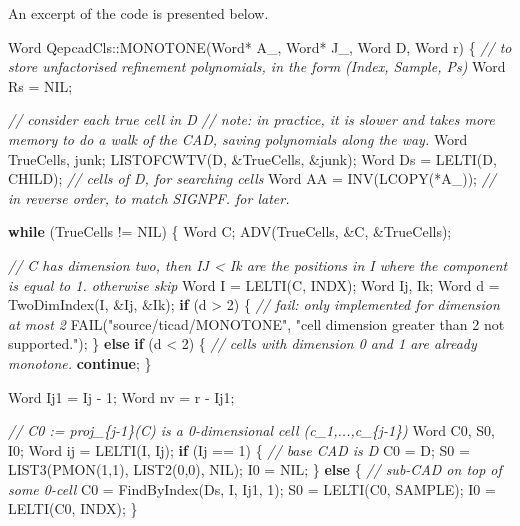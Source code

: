 \documentclass[
]{book}
\newenvironment{Shaded}{\begin{snugshade}}{\end{snugshade}}
\newcommand{\CommentTok}[1]{\textcolor[rgb]{0.56,0.35,0.01}{\textit{#1}}}
\newcommand{\ControlFlowTok}[1]{\textcolor[rgb]{0.13,0.29,0.53}{\textbf{#1}}}
\newcommand{\DecValTok}[1]{\textcolor[rgb]{0.00,0.00,0.81}{#1}}
\newcommand{\NormalTok}[1]{#1}
\newcommand{\StringTok}[1]{\textcolor[rgb]{0.31,0.60,0.02}{#1}}
\theoremstyle{definition}
\theoremstyle{definition}
\theoremstyle{definition}
\theoremstyle{definition}
\theoremstyle{remark}
\begin{document}
An excerpt of the code is presented below.

\begin{Shaded}
\begin{Highlighting}[numbers=left,,]
\NormalTok{Word QepcadCls::MONOTONE(Word* A\_, Word* J\_, Word D, Word r)}
\NormalTok{\{}
    \CommentTok{// to store unfactorised refinement polynomials, in the form (Index, Sample, Ps)}
\NormalTok{    Word Rs = NIL;}

    \CommentTok{// consider each true cell in D}
    \CommentTok{// note: in practice, it is slower and takes more memory to do a walk of the CAD, saving polynomials along the way.}
\NormalTok{    Word TrueCells, junk;}
\NormalTok{    LISTOFCWTV(D, \&TrueCells, \&junk);}
\NormalTok{    Word Ds = LELTI(D, CHILD); }\CommentTok{// cells of D, for searching cells}
\NormalTok{    Word AA = INV(LCOPY(*A\_)); }\CommentTok{// in reverse order, to match SIGNPF. for later.}

    \ControlFlowTok{while}\NormalTok{ (TrueCells != NIL) \{}
\NormalTok{        Word C;}
\NormalTok{        ADV(TrueCells, \&C, \&TrueCells);}

        \CommentTok{// C has dimension two, then IJ \textless{} Ik are the positions in I where the component is equal to 1. otherwise skip}
\NormalTok{        Word I = LELTI(C, INDX);}
\NormalTok{        Word Ij, Ik;}
\NormalTok{        Word d = TwoDimIndex(I, \&Ij, \&Ik);}
        \ControlFlowTok{if}\NormalTok{ (d \textgreater{} }\DecValTok{2}\NormalTok{) \{}
            \CommentTok{// fail: only implemented for dimension at most 2}
\NormalTok{            FAIL(}\StringTok{"source/ticad/MONOTONE"}\NormalTok{, }\StringTok{"cell dimension greater than 2 not supported."}\NormalTok{);}
\NormalTok{        \} }\ControlFlowTok{else} \ControlFlowTok{if}\NormalTok{ (d \textless{} }\DecValTok{2}\NormalTok{) \{}
            \CommentTok{// cells with dimension 0 and 1 are already monotone.}
            \ControlFlowTok{continue}\NormalTok{;}
\NormalTok{        \}}

\NormalTok{        Word Ij1 = Ij {-} }\DecValTok{1}\NormalTok{;}
\NormalTok{        Word nv = r {-} Ij1;}

        \CommentTok{// C0 := proj\_\{j{-}1\}(C) is a 0{-}dimensional cell (c\_1,...,c\_\{j{-}1\})}
\NormalTok{        Word C0, S0, I0;}
\NormalTok{        Word ij = LELTI(I, Ij);}
        \ControlFlowTok{if}\NormalTok{ (Ij == }\DecValTok{1}\NormalTok{) \{ }\CommentTok{// base CAD is D}
\NormalTok{            C0 = D;}
\NormalTok{            S0 = LIST3(PMON(}\DecValTok{1}\NormalTok{,}\DecValTok{1}\NormalTok{), LIST2(}\DecValTok{0}\NormalTok{,}\DecValTok{0}\NormalTok{), NIL);}
\NormalTok{            I0 = NIL;}
\NormalTok{        \} }\ControlFlowTok{else}\NormalTok{ \{ }\CommentTok{// sub{-}CAD on top of some 0{-}cell}
\NormalTok{            C0 = FindByIndex(Ds, I, Ij1, }\DecValTok{1}\NormalTok{);}
\NormalTok{            S0 = LELTI(C0, SAMPLE);}
\NormalTok{            I0 = LELTI(C0, INDX);}
\NormalTok{        \}}


\end{Highlighting}
\end{Shaded}
\end{document}
